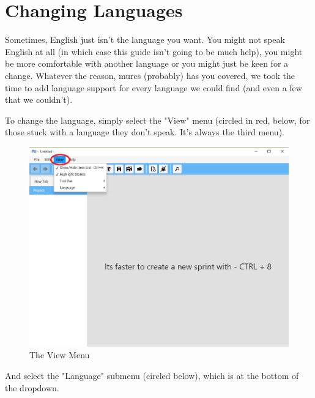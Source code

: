 \section{Changing Languages}

Sometimes, English just isn't the language you want. You might not speak English at all (in which case this guide isn't going to be much help), you might be more comfortable with another language or you might just be keen for a change. Whatever the reason, murcs (probably) has you covered, we took the time to add language support for every language we could find (and even a few that we couldn't).

To change the language, simply select the "View" menu (circled in red, below, for those stuck with a language they don't speak. It's always the third menu).

\begin{figure}[H]
\centering
\includegraphics[width=\textwidth]{images/screenshots/language1.png}
\caption{The View Menu}
\label{fig:new_project}
\end{figure}

And select the "Language" submenu (circled below), which is at the bottom of the dropdown.

